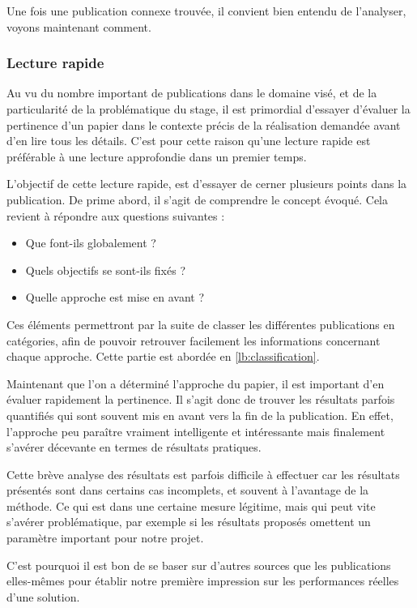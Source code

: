 \documentclass{tnreport}
\begin{document}
Une fois une publication connexe trouvée, il convient bien entendu de l'analyser, voyons maintenant comment.

\subsubsection{Lecture rapide}
Au vu du nombre important de publications dans le domaine visé, et de la particularité de la problématique du stage, il est primordial d'essayer d'évaluer la pertinence d'un papier dans le contexte précis de la réalisation demandée avant d'en lire tous les détails. C'est pour cette raison qu'une lecture rapide est préférable à une lecture approfondie dans un premier temps. 

L'objectif de cette lecture rapide, est d'essayer de cerner plusieurs points dans la publication. De prime abord, il s'agit de comprendre le concept évoqué. Cela revient à répondre aux questions suivantes :
\begin{itemize}
    \item Que font-ils globalement ?
    \item Quels objectifs se sont-ils fixés ?
    \item Quelle approche est mise en avant ?
\end{itemize}    

Ces éléments permettront par la suite de classer les différentes publications en catégories, afin de pouvoir retrouver facilement les informations concernant chaque approche. Cette partie est abordée en \ref{lb:classification}.

Maintenant que l'on a déterminé l'approche du papier, il est important d'en évaluer rapidement la pertinence. Il s'agit donc de trouver les résultats parfois quantifiés qui sont souvent mis en avant vers la fin de la publication. En effet, l'approche peu paraître vraiment intelligente et intéressante mais finalement s'avérer décevante en termes de résultats pratiques. 

Cette brève analyse des résultats est parfois difficile à effectuer car les résultats présentés sont dans certains cas incomplets, et souvent à l'avantage de la méthode. Ce qui est dans une certaine mesure légitime, mais qui peut vite s'avérer problématique, par exemple si les résultats proposés omettent un paramètre important pour notre projet. 

C'est pourquoi il est bon de se baser sur d'autres sources que les publications elles-mêmes pour établir notre première impression sur les performances réelles d'une solution. 
\clearpage
\end{document}
